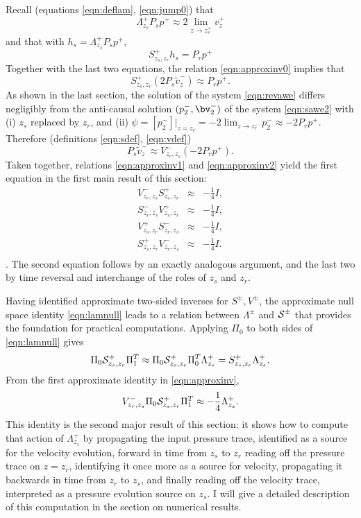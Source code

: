 Recall (equations \ref{eqn:deflam}, \ref{eqn:jump0}) that
\[
  \Lambda^+_{z_s} P_s p^+ \approx 2 \lim_{z \rightarrow z_s^+}v^+_z 
\]
and that with $h_s= \Lambda^+_{z_s}P_sp^+$,
\[
  S^+_{z_s,z_r}h_s = P_r p^+
\]
Together with the last two equations, the relation
\ref{eqn:approxinv0} implies that
\begin{equation}
  \label{eqn:approxinv1}
  S^+_{z_s,z_r}(2 P_s \tilde{v}_z^-) \approx P_rp^+.
\end{equation}
As shown in the last section, the solution of the system
\ref{eqn:revawe} differs negligibly from the anti-causal solution $(p^-_2,\bv^-_2)$
of the system \ref{eqn:sawe2} with (i) $z_s$ replaced by $z_r$, and
(ii) $\psi = [p^-_2]|_{z=z_r} = -2 \lim_{z \rightarrow z_r^-} p^-_2
\approx -2 P_rp^+$. Therefore (definitions \ref{eqn:sdef}, \ref{eqn:vdef})
\begin{equation}
  \label{eqn:approxinv2}
  P_s \tilde{v}_z^- \approx V^-_{z_r,z_s}(-2 P_rp^+).
\end{equation}
Taken together, relations \ref{eqn:approxinv1} and
\ref{eqn:approxinv2} yield the first equation in the first main result of this section:
\begin{eqnarray}
  \label{eqn:approxinv}
  V^-_{z_r,z_s} S^+_{z_s,z_r} & \approx & -\frac{1}{4}I, \nonumber\\
  S^-_{z_r,z_s} V^+_{z_s,z_r} & \approx & -\frac{1}{4}I, \nonumber\\
  V^+_{z_s,z_r} S^-_{z_r,z_s} & \approx & -\frac{1}{4}I, \nonumber\\
  S^+_{z_s,z_r} V^-_{z_r,z_s} & \approx & -\frac{1}{4}I.\\
\end{eqnarray}.
The second equation follows by an exactly analogous argument, and the
last two by time reversal and interchange of the roles of $z_s$ and
$z_r$.

Having identified approximate two-sided inverses for $S^{\pm},
V^{\pm}$, the approximate null space identity \ref{eqn:lamnull} leads
to a relation between $\Lambda^{\pm}$ and ${\cal S}^{\pm}$ that
provides the foundation for practical computations. Applying $\Pi_0$
to both sides of \ref{eqn:lamnull} gives
\[
 \Pi_0 {\cal S}^+_{z_s,z_r}\Pi_1^T \approx \Pi_0 {\cal S}^+_{z_s,z_r}\Pi_0^T
 \Lambda^+_{z_s} = S^+_{z_s,z_r} \Lambda^+_{z_s}.
\]
From the first approximate identity in \ref{eqn:approxinv},
\begin{equation}
  \label{eqn:lamident}
  V^{-}_{z_r,z_s}\Pi_0 {\cal S}^+_{z_s,z_r}\Pi_1^T \approx -\frac{1}{4}\Lambda^+_{z_s}.
\end{equation}
This identity is the second major result of this section: it shows how
to compute that action of $\Lambda^+_{z_s}$ by propagating the input
pressure trace, identified as a source for the velocity evolution,
forward in time from $z_s$ to $z_r$
reading off the pressure trace on $z=z_r$, identifying it once more as
a source for velocity, propagating it backwards in time from $z_r$ to
$z_s$, and finally reading off the velocity trace, interpreted as a
pressure evolution source on $z_s$. I will give a detailed description
of this computation in the section on numerical results.

